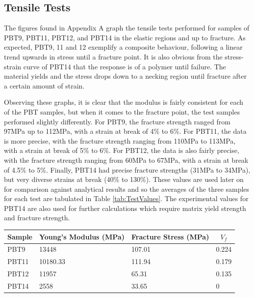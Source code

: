 \documentclass[11pt]{article}
\begin{document}
\subsection{Tensile Tests}
The figures found in Appendix A graph the tensile tests performed for samples of PBT9, PBT11, PBT12, and PBT14 in the elastic regions and up to fracture. As expected, PBT9, 11 and 12 exemplify a composite behaviour, following a linear trend upwards in stress until a fracture point. It is also obvious from the stress-strain curve of PBT14  that the response is of a polymer until failure. The material yields and the stress drops down to a necking region until fracture after a certain amount of strain.

Observing these graphs, it is clear that the modulus is fairly consistent for each of the PBT samples, but when it comes to the fracture point, the test samples performed slightly differently. For PBT9, the fracture strength ranged from 97MPa up to 112MPa, with a strain at break of 4\% to 6\%. For PBT11, the data is more precise, with the fracture strength ranging from 110MPa to 113MPa, with a strain at break of 5\% to 6\%. For PBT12, the data is also fairly precise, with the fracture strength ranging from 60MPa to 67MPa, with a strain at break of 4.5\% to 5\%. Finally, PBT14 had precise fracture strengths (31MPa to 34MPa), but very diverse strains at break (40\% to 130\%). These values are used later on for comparison against analytical results and so the averages of the three samples for each test are tabulated in Table \ref{tab:TestValues}. The experimental values for PBT14 are also used for further calculations which require matrix yield strength and fracture strength.

\onehalfspacing
\begin{center}
 \label{tab:TestValues}
\begin{tabular}{p{1.5cm} || p{} | p{} | p{1.5cm} }
\hline
Sample & \multicolumn{1}{c|}{Young's Modulus (MPa)} & \multicolumn{1}{c|}{Fracture Stress (MPa)} & \multicolumn{1}{c}{\(V_f\)}  \\
\hline
\hline
PBT9 & 13448 & 107.01 & 0.224\\
PBT11 & 10180.33  & 111.94 & 0.179\\
PBT12 & 11957 & 65.31 & 0.135 \\
PBT14 & 2558 & 33.65 & 0\\
\hline
\end{tabular}
\end{center}
\singlespacing
\end{document}
